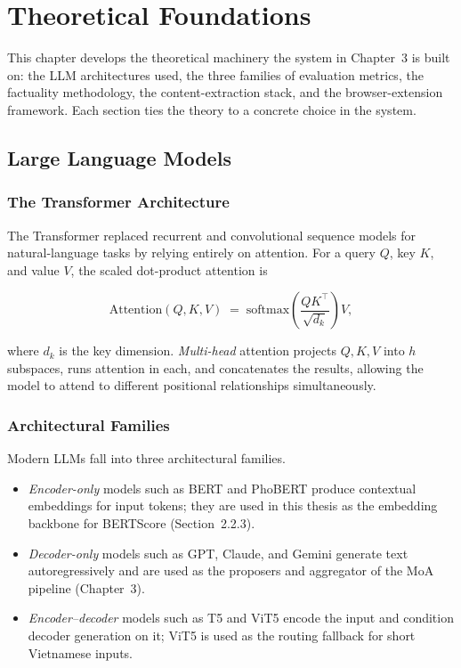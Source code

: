 \chapter{Theoretical Foundations}

This chapter develops the theoretical machinery the system in Chapter~3 is
built on: the LLM architectures used, the three families of evaluation
metrics, the factuality methodology, the content-extraction stack, and the
browser-extension framework. Each section ties the theory to a concrete
choice in the system.

\section{Large Language Models}

\subsection{The Transformer Architecture}

The Transformer \cite{Vaswani2017} replaced recurrent and convolutional
sequence models for natural-language tasks by relying entirely on attention.
For a query $Q$, key $K$, and value $V$, the scaled dot-product attention is

\[
\text{Attention}(Q,K,V) \;=\; \text{softmax}\!\left(\frac{QK^{\top}}{\sqrt{d_k}}\right) V,
\]

\noindent where $d_k$ is the key dimension. \textit{Multi-head} attention
projects $Q, K, V$ into $h$ subspaces, runs attention in each, and
concatenates the results, allowing the model to attend to different
positional relationships simultaneously.

\subsection{Architectural Families}

Modern LLMs fall into three architectural families.

\begin{itemize}
  \item \textit{Encoder-only} models such as BERT and PhoBERT \cite{Nguyen2020}
        produce contextual embeddings for input tokens; they are used in this
        thesis as the embedding backbone for BERTScore (Section~2.2.3).
  \item \textit{Decoder-only} models such as GPT, Claude, and Gemini
        generate text autoregressively and are used
        as the proposers and aggregator of the MoA pipeline (Chapter~3).
  \item \textit{Encoder--decoder} models such as T5 and
        ViT5 \cite{Nguyen2022} encode the input and condition decoder
        generation on it; ViT5 is used as the routing fallback for short
        Vietnamese inputs.
\end{itemize}

